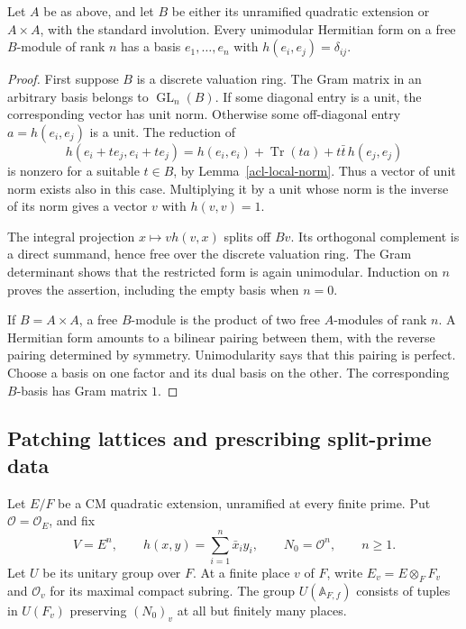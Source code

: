 \begin{proposition}
\label{acl-local-basis}
Let $A$ be as above, and let $B$ be either its unramified quadratic
extension or $A\times A$, with the standard involution. Every
unimodular Hermitian form on a free $B$-module of rank $n$ has a
basis $e_1,\ldots,e_n$ with $h(e_i,e_j)=\delta_{ij}$.
\end{proposition}
\begin{proof}
First suppose $B$ is a discrete valuation ring. The Gram matrix
in an arbitrary basis belongs to $\operatorname{GL}_n(B)$.
If some diagonal entry is a unit, the corresponding vector has
unit norm. Otherwise some off-diagonal entry $a=h(e_i,e_j)$
is a unit. The reduction of
\[
 h(e_i+te_j,e_i+te_j)
   =h(e_i,e_i)+\operatorname{Tr}(ta)+t\bar t\,h(e_j,e_j)
\]
is nonzero for a suitable $t\in B$, by
Lemma~\ref{acl-local-norm}. Thus a vector of unit norm exists
also in this case. Multiplying it by a unit whose norm is the
inverse of its norm gives a vector $v$ with $h(v,v)=1$.

The integral projection $x\mapsto v h(v,x)$ splits off $Bv$.
Its orthogonal complement is a direct summand, hence free over
the discrete valuation ring. The Gram determinant shows that
the restricted form is again unimodular. Induction on $n$
proves the assertion, including the empty basis when $n=0$.

If $B=A\times A$, a free $B$-module is the product of two
free $A$-modules of rank $n$. A Hermitian form amounts to a
bilinear pairing between them, with the reverse pairing
determined by symmetry. Unimodularity says that this pairing
is perfect. Choose a basis on one factor and its dual basis
on the other. The corresponding $B$-basis has Gram matrix $1$.
\end{proof}

\subsection{Patching lattices and prescribing split-prime data}

Let $E/F$ be a CM quadratic extension, unramified at every finite
prime. Put $\mathcal O=\mathcal O_E$, and fix
\[
 V=E^n,\qquad h(x,y)=\sum_{i=1}^n\bar x_i y_i,
 \qquad N_0=\mathcal O^n,\qquad n\geq1.
\]
Let $U$ be its unitary group over $F$. At a finite place $v$ of
$F$, write $E_v=E\otimes_FF_v$ and $\mathcal O_v$ for its
maximal compact subring. The group $U(\mathbb A_{F,f})$ consists
of tuples in $U(F_v)$ preserving $(N_0)_v$ at all but finitely
many places.

